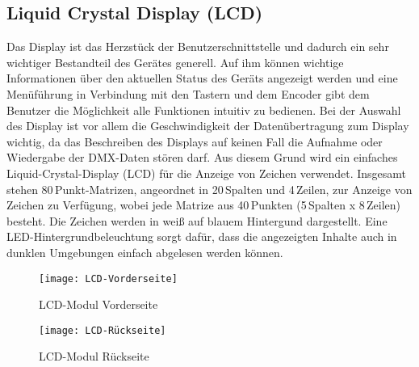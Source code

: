 
\subsection{Liquid Crystal Display (LCD)}
\label{sec:HardLCD}
Das Display ist das Herzstück der Benutzerschnittstelle und dadurch ein sehr wichtiger Bestandteil des Gerätes generell. Auf ihm können wichtige Informationen über den aktuellen Status des Geräts angezeigt werden und eine Menüführung in Verbindung mit den Tastern und dem Encoder gibt dem Benutzer die Möglichkeit alle Funktionen intuitiv zu bedienen. Bei der Auswahl des Display ist vor allem die Geschwindigkeit der Datenübertragung zum Display wichtig, da das Beschreiben des Displays auf keinen Fall die Aufnahme oder Wiedergabe der DMX-Daten stören darf. Aus diesem Grund wird ein einfaches Liquid-Crystal-Display (LCD) für die Anzeige von Zeichen verwendet. Insgesamt stehen 80\,Punkt-Matrizen, angeordnet in 20\,Spalten und 4\,Zeilen, zur Anzeige von Zeichen zu Verfügung, wobei jede Matrize aus 40\,Punkten (5\,Spalten x 8\,Zeilen) besteht. Die Zeichen werden in weiß auf blauem Hintergund dargestellt. Eine LED-Hintergrundbeleuchtung sorgt dafür, dass die angezeigten Inhalte auch in dunklen Umgebungen einfach abgelesen werden können.
\begin{figure}[h]
	\begin{minipage}{.45\linewidth}
		\centering
		\texttt{[image: LCD-Vorderseite]}
		\caption{LCD-Modul Vorderseite}
		\label{fig:LCD-front}
	\end{minipage}
	\hfill
	\begin{minipage}{.45\linewidth}
		\centering
		\texttt{[image: LCD-Rückseite]}
		\caption{LCD-Modul Rückseite}
		\label{fig:LCD-back}
	\end{minipage}
\end{figure}
